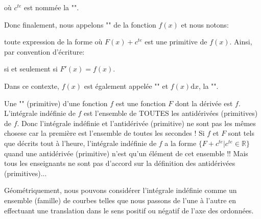 	où $c^{te}$ est nommée la "\label{constant of integration}".
	
	Donc finalement, nous appelons "" de la fonction $f(x)$ et nous notons:
	
	toute expression de la forme où  $F (x)+c^{te}$ est une primitive de $f(x)$. Ainsi, par convention d'écriture:
	
	si et seulement si $F'(x)=f(x)$.
	
	Dans ce contexte, $f(x)$ est également appelée "" et $f(x)\mathrm{d}x$, la "".
	\begin{tcolorbox}[title=Remarque,colframe=black,arc=10pt]
	Une "" (primitive) d'une fonction $f$ est une fonction $F$ dont la dérivée est $f$. L'intégrale indéfinie de $f$ est l'ensemble de TOUTES les antidérivées (primitives) de $f$. Donc l'intégrale indéfinie et l'antidérivée (primitive) ne sont pas les mêmes chosese car la première est l'ensemble de toutes les secondes ! Si $f$ et $F$ sont tels que décrits tout à l'heure, l'intégrale indéfinie de $f$ a la forme $\{F+c^{te}|c^{te}\in\mathbb{R}\}$ quand une antidérivée (primitive) n'est qu'un élément de cet ensemble !! Mais tous les enseignants ne sont pas d'accord sur la définition des antidérivées (primitives)...
	\end{tcolorbox}
	
	Géométriquement, nous pouvons considérer l'intégrale indéfinie comme un ensemble (famille) de courbes telles que nous passons de l'une à l'autre en effectuant une translation dans le sens positif ou négatif de l'axe des ordonnées.
	
